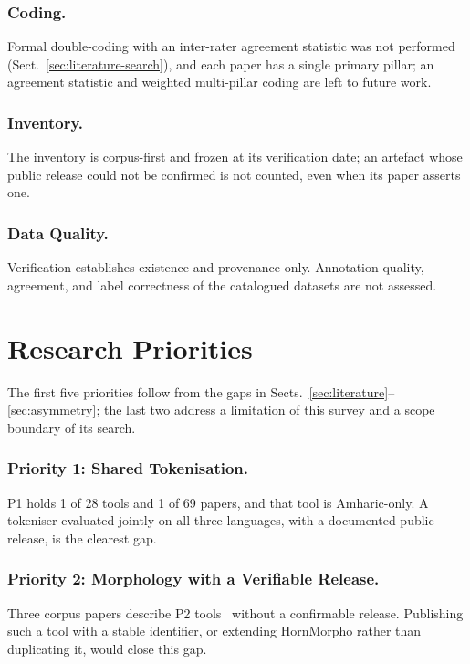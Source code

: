 \documentclass[runningheads]{llncs}
\begin{document}
\subsubsection{Coding.} Formal double-coding with an inter-rater agreement statistic was not performed (Sect.~\ref{sec:literature-search}), and each paper has a single primary pillar; an agreement statistic and weighted multi-pillar coding are left to future work.

\subsubsection{Inventory.} The inventory is corpus-first and frozen at its verification date; an artefact whose public release could not be confirmed is not counted, even when its paper asserts one.

\subsubsection{Data Quality.} Verification establishes existence and provenance only. Annotation quality, agreement, and label correctness of the catalogued datasets are not assessed.

\section{Research Priorities}\label{sec:agenda}

The first five priorities follow from the gaps in Sects.~\ref{sec:literature}--\ref{sec:asymmetry}; the last two address a limitation of this survey and a scope boundary of its search.


\subsubsection{Priority 1: Shared Tokenisation.} P1 holds 1 of 28 tools and 1 of 69 papers, and that tool is Amharic-only. A tokeniser evaluated jointly on all three languages, with a documented public release, is the clearest gap.

\subsubsection{Priority 2: Morphology with a Verifiable Release.} Three corpus papers describe P2 tools~\cite{gidey_morphological_2024,gebremeskel_tigrigna_2023,nigusie_suffixinflectional_2024} without a confirmable release. Publishing such a tool with a stable identifier, or extending HornMorpho rather than duplicating it, would close this gap.
\end{document}
